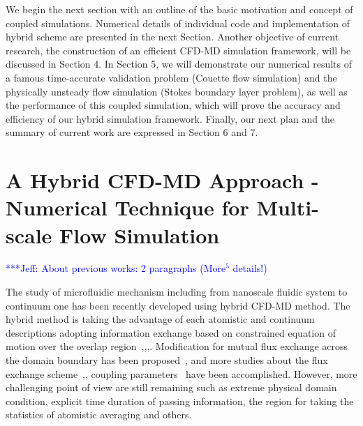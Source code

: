\documentclass[conference,final]{IEEEtran}
\newcommand{\skonote}[1]{ {\textcolor{blue} { ***Jeff: #1 }}}
\newcommand{\skonote}[1]{}
\begin{document}
We begin the next section with an outline of the basic motivation and concept of coupled simulations. Numerical details of individual code and implementation of hybrid scheme are presented in the next Section. Another objective of current research, the construction of an efficient CFD-MD simulation framework, will be discussed in Section 4. In Section 5, we will demonstrate our numerical results of a famous time-accurate validation problem (Couette flow simulation) and the physically unsteady flow simulation (Stokes boundary layer problem), as well as the performance of this coupled simulation, which will prove the accuracy and efficiency of our hybrid simulation framework. Finally, our next plan and the summary of current work are expressed in Section 6 and 7.
\newline



\section{A Hybrid CFD-MD Approach - Numerical Technique for Multi-scale Flow Simulation}


\skonote{About previous works: 2 paragraphs (More$^5$ details!)}

The study of microfluidic mechanism including from nanoscale fluidic system to continuum one has been recently developed using hybrid CFD-MD method. The hybrid method is taking the advantage of each atomistic and continuum descriptions adopting information exchange based on constrained equation of motion over the overlap region~\cite{Thompson},\cite{Nie},\cite{Yen},\cite{Steijl}. Modification for mutual flux exchange across the domain boundary has been proposed~\cite{Flekkoy},\cite{Wagner} and more studies about the flux exchange scheme~\cite{Hadjicon1},\cite{Hadjicon2}, coupling parameters~\cite{Wang} have been accomplished. However, more challenging point of view are still remaining such as extreme physical domain condition, explicit time duration of passing information, the region for taking the statistics of atomistic averaging and others.
\newline
\end{document}
